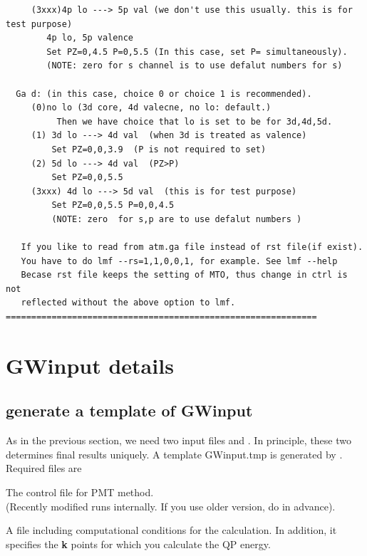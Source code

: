 {\begin{verbatim}
     (3xxx)4p lo ---> 5p val (we don't use this usually. this is for test purpose)
        4p lo, 5p valence 
        Set PZ=0,4.5 P=0,5.5 (In this case, set P= simultaneously).
        (NOTE: zero for s channel is to use defalut numbers for s)

  Ga d: (in this case, choice 0 or choice 1 is recommended).
     (0)no lo (3d core, 4d valecne, no lo: default.)
          Then we have choice that lo is set to be for 3d,4d,5d.
     (1) 3d lo ---> 4d val  (when 3d is treated as valence)
         Set PZ=0,0,3.9  (P is not required to set)
     (2) 5d lo ---> 4d val  (PZ>P)
         Set PZ=0,0,5.5
     (3xxx) 4d lo ---> 5d val  (this is for test purpose)
         Set PZ=0,0,5.5 P=0,0,4.5
         (NOTE: zero  for s,p are to use defalut numbers )

   If you like to read from atm.ga file instead of rst file(if exist).
   You have to do lmf --rs=1,1,0,0,1, for example. See lmf --help
   Becase rst file keeps the setting of MTO, thus change in ctrl is not
   reflected without the above option to lmf.
=============================================================
\end{verbatim}


\newpage
\section{GWinput details}
\label{maininput}
\vspace{3mm}
\subsection{\bf generate a template of {\sf GWinput}}
As in the previous section, we need two input files  and
. In principle, these two determines final results uniquely.
A template {\sf GWinput.tmp} is generated by . 
Required files are

\infiles

The control file for PMT method.\\
(Recently modified  runs  internally.
If you use older version, do  in advance).

\outfiles


 A file including computational conditions
for the \GW calculation.
In addition, it specifies the {\bf k} points for 
which you calculate the QP energy.

}
